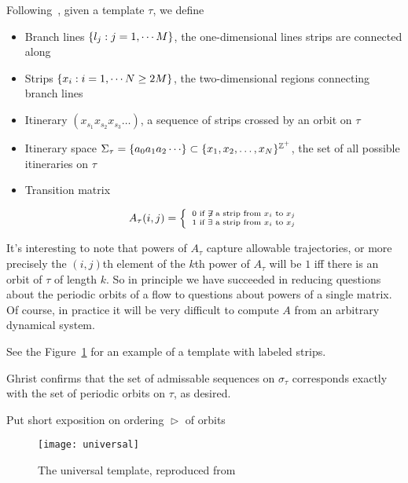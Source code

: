 \documentclass[paper.tex]{subfiles}
\begin{document}
\begin{definition}
  Following~\cite{knottyode}, given a template $\tau$, we define
  \begin{itemize}
    \item Branch lines  $\{ l_j : j = 1, \cdots M \}$, the one-dimensional lines strips are connected along
    \item Strips $\{ x_i : i = 1, \cdots N \geq 2 M \}$, the two-dimensional regions connecting branch lines
    \item Itinerary $(x_{s_1}x_{s_2}x_{s_3} \dots)$, a sequence of strips crossed by an orbit on $\tau$
    \item Itinerary space $\Sigma_\tau = \set{a_0 a_1 a_2 \cdots} \subset \set{x_1, x_2, \ldots, x_N}^{\Z^+}$, the set of all possible itineraries on $\tau$
    \item Transition matrix

      \begin{equation}
        A_\tau(i,j) = \left\{ \
        \begin{smallmatrix}
          0 \text{ if } \not\exists \text{ a strip from } x_i \text{ to } x_j \\
          1 \text{ if } \exists \text{ a strip from } x_i \text{ to } x_j
        \end{smallmatrix}
        \right.
      \end{equation}
  \end{itemize}
\end{definition}

It's interesting to note that powers of $A_\tau$ capture allowable trajectories, or more precisely the $(i,j)$th element of the $k$th power of $A_\tau$ will be $1$ iff there is an orbit of $\tau$ of length $k$.
So in principle we have succeeded in reducing questions about the periodic orbits of a flow to questions about powers of a single matrix. Of course, in practice it will be very difficult to compute $A$ from an arbitrary
dynamical system.

See the Figure~\ref{fig:universal} for an example of a template with labeled strips.

Ghrist confirms that the set of admissable sequences on $\sigma_\tau$ corresponds exactly with the set of periodic orbits on $\tau$, as desired.


Put short exposition on ordering $\vartriangleright$ of orbits



\begin{figure}[h]
  \centering
  \texttt{[image: universal]}
  \caption{The universal template, reproduced from~\cite{knottyode}}\label{fig:universal}
\end{figure}
\end{document}

